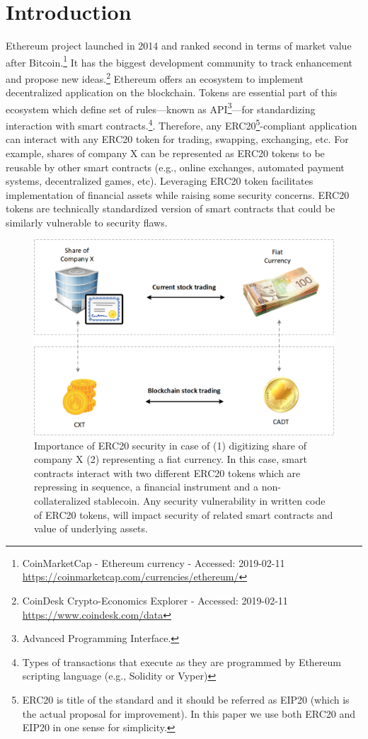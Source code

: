 
\section{Introduction}
Ethereum project\cite{Ref00} launched in 2014 and ranked second in terms of market value after Bitcoin.\footnote{CoinMarketCap - Ethereum currency - Accessed: 2019-02-11 \newline\url{https://coinmarketcap.com/currencies/ethereum/}} It has the biggest development community to track enhancement and propose new ideas.\footnote{CoinDesk Crypto-Economics Explorer - Accessed: 2019-02-11 \newline\url{https://www.coindesk.com/data}} Ethereum offers an ecosystem to implement decentralized application on the blockchain. Tokens are essential part of this ecosystem which define set of rules---known as API\footnote{Advanced Programming Interface.}---for standardizing interaction with smart contracts.\footnote{Types of transactions that execute as they are programmed by Ethereum scripting language (e.g., Solidity or Vyper)}. Therefore, any ERC20\footnote{ERC20 is title of the standard and it should be referred as EIP20 (which is the actual proposal for improvement). In this paper we use both ERC20 and EIP20 in one sense for simplicity.}-compliant application can interact with any ERC20 token for trading, swapping, exchanging, etc. For example, shares of company X can be represented as ERC20 tokens to be reusable by other smart contracts (e.g., online exchanges, automated payment systems, decentralized games, etc). Leveraging ERC20 token facilitates implementation of financial assets while raising some security concerns. ERC20 tokens are technically standardized version of smart contracts that could be similarly vulnerable to security flaws.
\begin{figure}[t]
	\centering
	\includegraphics[width=1.0\linewidth]{figures/multiple_withdrawal_01.png}
	\caption{Importance of ERC20 security in case of (1) digitizing share of company X (2) representing a fiat currency. In this case, smart contracts interact with two different ERC20 tokens which are repressing in sequence, a financial instrument and a non-collateralized stablecoin. Any security vulnerability in written code of ERC20 tokens, will impact security of related smart contracts and value of underlying assets.}
\end{figure}

